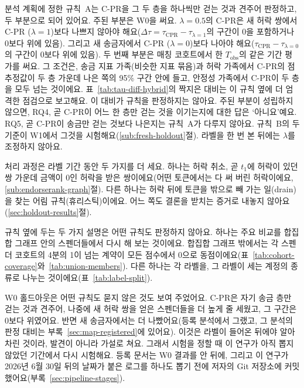 분석 계획에 정한 규칙~A는 \mbox{C-PR}을 그 두 층을 하나씩만 걷는 것과 견주어 판정하고, 두 부분으로 되어 있어요. 주된 부분은 W0을 써요. $\lambda=0.5$의 \mbox{C-PR}은 새 허락 쌍에서 \mbox{C-PR} ($\lambda=1$)보다 나쁘지 않아야 해요($\Delta\tau=\tau_{\mathrm{CPR}}-\tau_{\lambda=1}$의 구간이 0을 포함하거나 0보다 위에 있음). 그리고 새 송금자에서 \mbox{C-PR} ($\lambda=0$)보다 나아야 해요($\tau_{\mathrm{CPR}}-\tau_{\lambda=0}$의 구간이 0보다 위에 있음). 두 번째 부분은 매칭 코호트에서 한 $T_{\mathrm{obs}}$의 같은 기간 평가를 써요. 그 조건은, 송금 지표 가족(비슷한 지표 묶음)과 허락 가족에서 \mbox{C-PR}의 점 추정값이 두 층 가운데 나은 쪽의 95\% 구간 안에 들고, 안정성 가족에서 \mbox{C-PR}이 두 층을 모두 넘는 것이에요. 표~\ref{tab:tau-diff-hybrid}의 짝지은 대비는 이 규칙 옆에 더 엄격한 점검으로 보고해요. 이 대비가 규칙을 판정하지는 않아요. 주된 부분이 성립하지 않으면, RQ4, 곧 \mbox{C-PR}이 어느 한 층만 걷는 것을 이기는지에 대한 답은 ‘아니요’예요. RQ5, 곧 \mbox{C-PR}이 송금만 걷는 것보다 나은지는 규칙~A가 다루지 않아요. 규칙~B의 두 기준이 W1에서 그것을 시험해요(\ref{sub:fresh-holdout}절). 라벨을 한 번 본 뒤에는 $\lambda$를 조정하지 않아요.

처리 과정은 라벨 기간 동안 두 가지를 더 세요. 하나는 허락 취소, 곧 $t_1$에 허락이 있던 쌍 가운데 금액이 0인 허락을 받은 쌍이에요(어떤 토큰에서는 다 써 버린 허락이에요, \ref{sub:endorserank-graph}절). 다른 하나는 허락 뒤에 토큰을 밖으로 빼 가는 일(drain)을 찾는 어림 규칙(휴리스틱)이에요. 어느 쪽도 결론을 받치는 증거로 내놓지 않아요(\ref{sec:holdout-results}절).

규칙 옆에 두는 두 가지 설명은 어떤 규칙도 판정하지 않아요. 하나는 주요 비교를 합집합 그래프 안의 스펜더들에서 다시 해 보는 것이에요. 합집합 그래프 밖에서는 각 스펜더 코호트의 4분의 1이 넘는 계약이 모든 점수에서 0으로 동점이에요(표~\ref{tab:cohort-coverage}와~\ref{tab:union-members}). 다른 하나는 각 라벨을, 그 라벨이 세는 계정의 종류로 나누는 것이에요(표~\ref{tab:label-split}).


W0 홀드아웃은 어떤 규칙도 묻지 않은 것도 보여 주었어요. \mbox{C-PR}은 자기 송금 층만 걷는 것과 견주어, 나중에 새 허락 쌍을 얻은 스펜더들을 더 높게 줄 세웠고, 그 구간은 0보다 위였어요. 반면 새 송금자에서는 더 나빴어요(등록 분석에서 그랬고, 그 분석의 판정 대비는 부록~\ref{sec:map-registered}에 있어요). 이것은 라벨이 들어온 뒤에야 알아차린 것이라, 발견이 아니라 가설로 쳐요. 그래서 시험을 정할 때 이 연구가 아직 뽑지 않았던 기간에서 다시 시험해요. 등록 문서는 W0 결과를 안 뒤에, 그리고 이 연구가 2026년 6월 30일 뒤의 날짜가 붙은 로그를 하나도 뽑기 전에 저자의 Git 저장소에 커밋했어요(부록~\ref{sec:pipeline-stages}).

